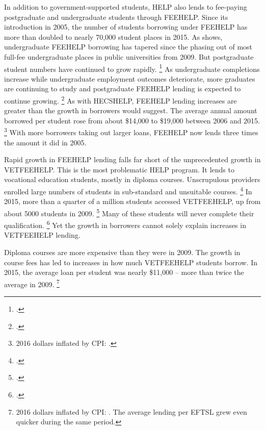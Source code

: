 \documentclass[embargoed]{grattan}
\begin{document}
In addition to government-supported students, \gls{HELP} also lends to fee-paying postgraduate and undergraduate students through \gls{FEEHELP}\@.
Since its introduction in 2005, the number of students borrowing under \gls{FEEHELP} has more than doubled to nearly 70,000 student places in 2015.
As  shows, undergraduate \gls{FEEHELP} borrowing has tapered since the phasing out of most full-fee undergraduate places in public universities from 2009.
But postgraduate student numbers have continued to grow rapidly.%
\footnote{\textcites[][Section~5, Table~5.1]{Education2015StudentsSelectedhigher}{Education2015Highereducationreport}.} As undergraduate completions increase while undergraduate employment outcomes deteriorate, more graduates are continuing to study and postgraduate \gls{FEEHELP} lending is expected to continue growing.%
\footcites{Norton2016MappingAustralianhigher}{Education2016uCubeHighereducation} %
As with \gls{HECSHELP}, \gls{FEEHELP} lending increases are greater than the growth in borrowers would suggest.
The average annual amount borrowed per student rose from about \$14,000 to \$19,000 between 2006 and 2015.%
\footnote{2016 dollars inflated by \gls{CPI}: \textcite{ABS2016ConsumerPriceIndex}.} With more borrowers taking out larger loans, \gls{FEEHELP} now lends three times the amount it did in 2005.

Rapid growth in \gls{FEEHELP} lending falls far short of the unprecedented growth in \gls{VETFEEHELP}\@.
This is the most problematic \gls{HELP} program.
It lends to vocational education students, mostly in diploma courses.
Unscrupulous providers enrolled large numbers of students in sub-standard and unsuitable courses.%
\footnote{\textcite{Education2015Gettingourmoneys}.} In 2015, more than a quarter of a million students accessed \gls{VETFEEHELP}, up from about 5000 students in 2009.%
\footnote{\textcite[][14]{Ryan2016RedesigningVETFEE}.} Many of these students will never complete their qualification.%
\footnote{\textcite{NCVER2015preliminaryanalysisoutcomes}.} Yet the growth in borrowers cannot solely explain increases in \gls{VETFEEHELP} lending.

Diploma courses are more expensive than they were in 2009.
The growth in course fees has led to increases in how much \gls{VETFEEHELP} students borrow.
In 2015, the average loan per student was nearly \$11,000 -- more than twice the average in 2009.%
\footnote{2016 dollars inflated by \gls{CPI}: \textcite[][17]{Ryan2016RedesigningVETFEE}.
The average lending per \gls{EFTSL} grew even quicker during the same period.}
\end{document}
